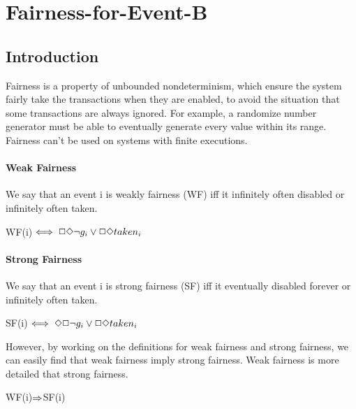 
\section{Fairness-for-Event-B}
\label{sec:Fairness-for-Event-B}


\subsection{Introduction}
Fairness is a property of unbounded nondeterminism, which ensure the system fairly take the transactions when they are enabled, to avoid the situation that some transactions are always ignored. For example, a randomize number generator must be able to eventually generate every value within its range. Fairness can't be used on systems with finite executions.

\paragraph{Weak Fairness}
We say that an event i is weakly fairness (WF) iff it infinitely often disabled or infinitely often taken.
\begin{center}
WF(i)$\iff\Box\Diamond\neg{g}_{i}\lor\Box\Diamond{taken}_{i}$ 
\end{center}

\paragraph{Strong Fairness}
We say that an event i is strong fairness (SF) iff it eventually disabled forever or infinitely often taken.
\begin{center}
SF(i)$\iff\Diamond\Box\neg{g}_{i}\lor\Box\Diamond{taken}_{i}$ 
\end{center}
However, by working on the definitions for weak fairness and strong fairness, we can easily find that weak fairness imply strong fairness. Weak fairness is more detailed that strong fairness.  
\begin{center}
WF(i)$\Rightarrow$SF(i) 
\end{center}

